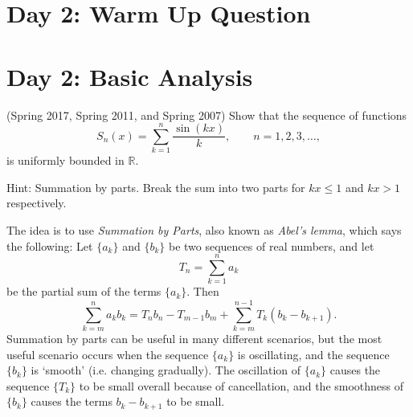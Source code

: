 \documentclass[answers]{exam}
\theoremstyle{problemstyle}
\newcommand{\1}[1]{\textbf{1}_{\left[#1\right]}} %
\def\R{\mathbb{R}} %
\def\blue{\color{Blue}}
\newcommand{\bnote}[1]{{\blue#1}} %
\begin{document}
\begin{questions}
\newpage
\section*{Day 2: Warm Up Question}

\newpage
\section{Day 2: Basic Analysis}

\question (Spring 2017, Spring 2011, and Spring 2007)
Show that the sequence of functions
  \begin{equation*}
    S_n(x)= \sum_{k=1}^{n}\frac{\sin(kx)}{k}, \quad \quad n=1,2,3,\ldots,
  \end{equation*}
  is uniformly bounded in $\R$.

\bnote{Hint: Summation by parts. Break the sum into two parts for $kx\leq 1$ and $kx>1$ respectively.}
\begin{solution}
The idea is to use \emph{Summation by Parts}, also known as \emph{Abel's lemma}, which says the following: Let $\{ a_k \}$ and $\{ b_k \}$ be two sequences of real numbers, and let
%
\[ T_n = \sum_{k = 1}^n a_k \]
%
be the partial sum of the terms $\{ a_k \}$. Then
%
\[ \sum_{k = m}^n a_k b_k = T_n b_n - T_{m-1} b_m + \sum_{k = m}^{n-1} T_k (b_k - b_{k+1}). \]
%
Summation by parts can be useful in many different scenarios, but the most useful scenario occurs when the sequence $\{ a_k \}$ is oscillating, and the sequence $\{ b_k \}$ is `smooth' (i.e. changing gradually). The oscillation of $\{ a_k \}$ causes the sequence $\{ T_k \}$ to be small overall because of cancellation, and the smoothness of $\{ b_k \}$ causes the terms $b_k - b_{k+1}$ to be small.


\end{solution}
\end{questions}
\end{document}
